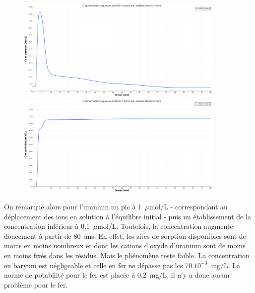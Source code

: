 \documentclass{article}
\begin{document}
\begin{figure}[H]
    \centering
    \begin{minipage}{0.5\textwidth}
        \centering
        \includegraphics[width=0.9\textwidth]{III_B_2_7.png} 
        \caption{}
        \label{fig:Fe_riviere_sable_Base}
    \end{minipage}\hfill
    \begin{minipage}{0.5\textwidth}
        \centering
        \includegraphics[width=0.9\textwidth]{III_B_2_8.png} 
        \caption{}
        \label{fig:Ba_riviere_sable_base}
    \end{minipage}
\end{figure}

On remarque alors pour l’uranium un pic à 1~$\mu$mol/L - correspondant au déplacement des ions en solution à l’équilibre initial - puis un établissement de la concentration inférieur à 0,1~$\mu$mol/L. Toutefois, la concentration augmente doucement à partir de 80~ans. En effet, les sites de sorption disponibles sont de moins en moins nombreux et donc les cations d’oxyde d’uranium sont de moins en moins fixés dans les résidus. Mais le phénomène reste faible. La concentration en baryum est négligeable et celle en fer ne dépasse pas les $70. 10^{-3}$~mg/L. La norme de potabilité pour le fer est placée à 0,2~mg/L, il n’y a donc aucun problème pour le fer.
\end{document}
